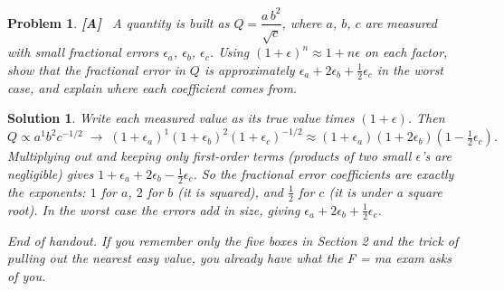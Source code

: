 \documentclass[11pt]{article}
\newcommand{\clearpts}{\addtocounter{tpts}{\value{cpts}} \setcounter{cpts}{0}}
\newcommand{\pts}[1]{\clearpts \setcounter{cpts}{#1}}
\newcommand{\advanced}{\!\textbf{\color{advblue}[A]\color{black}}\ }
\newtheorem*{solution}{Solution}
\theoremstyle{mystyle}
\newtheorem{pproblem}{Problem}
\begin{document}
\pts{4}
\begin{pproblem} \advanced
A quantity is built as $Q = \dfrac{a\,b^2}{\sqrt{c}}$, where $a$, $b$, $c$ are measured
with small fractional errors $\epsilon_a$, $\epsilon_b$, $\epsilon_c$. Using
$(1+\epsilon)^n \approx 1 + n\epsilon$ on each factor, show that the fractional error in
$Q$ is approximately $\epsilon_a + 2\epsilon_b + \tfrac12\epsilon_c$ in the worst case,
and explain where each coefficient comes from.
\end{pproblem}
\begin{solution}
Write each measured value as its true value times $(1+\epsilon)$. Then
\[
Q \propto a^{1} b^{2} c^{-1/2}
\;\to\; (1+\epsilon_a)^1(1+\epsilon_b)^2(1+\epsilon_c)^{-1/2}
\approx (1+\epsilon_a)(1+2\epsilon_b)(1-\tfrac12\epsilon_c).
\]
Multiplying out and keeping only first-order terms (products of two small $\epsilon$'s
are negligible) gives $1 + \epsilon_a + 2\epsilon_b - \tfrac12\epsilon_c$. So the
fractional error coefficients are exactly the exponents: $1$ for $a$, $2$ for $b$ (it is
squared), and $\tfrac12$ for $c$ (it is under a square root). In the worst case the errors
add in size, giving $\epsilon_a + 2\epsilon_b + \tfrac12\epsilon_c$.
\end{solution}

\vspace{1em}
\begin{center}
\emph{End of handout. If you remember only the five boxes in Section 2 and the trick of
pulling out the nearest easy value, you already have what the F = ma exam asks of you.}
\end{center}
\end{document}
